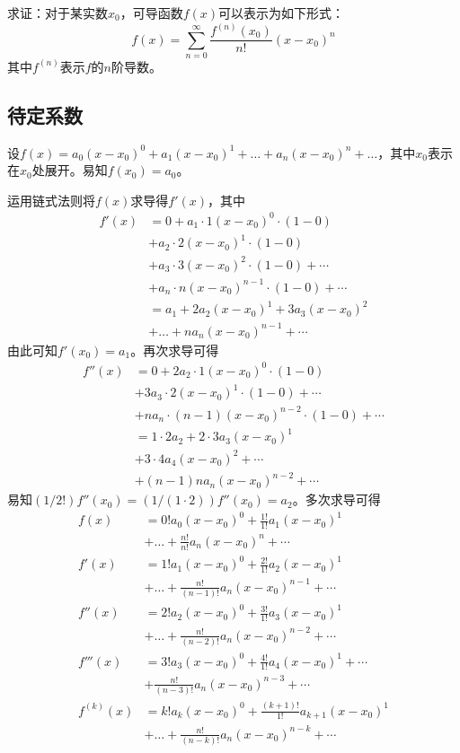 

求证：对于某实数$x_0$，可导函数$f(x)$可以表示为如下形式：
\[ f(x) = \sum_{n = 0}^\infty \frac{f^{(n)}(x_0)}{n!}(x - x_0)^n \]
其中$f^{(n)}$表示$f$的$n$阶导数。

\subsection{待定系数}

设$f(x) = a_0(x - x_0)^0 + a_1(x - x_0)^1 + \dots + a_n(x - x_0)^n + \dots$，其中$x_0$表示在$x_0$处展开。易知$f(x_0) = a_0$。

运用链式法则将$f(x)$求导得$f'(x)$，其中
\begin{align*}
  f'(x) &= 0 + a_1\cdot1(x - x_0)^0\cdot(1 - 0) \\
  &+ a_2\cdot2(x - x_0)^1\cdot(1 - 0) \\
  &+ a_3\cdot3(x - x_0)^2\cdot(1 - 0) + \cdots \\
  &+ a_n\cdot n(x - x_0)^{n - 1}\cdot(1 - 0) + \cdots \\
  &= a_1 + 2a_2(x - x_0)^1 + 3a_3(x - x_0)^2 \\
  &+ \dots + na_n(x - x_0)^{n - 1} + \cdots
\end{align*}
由此可知$f'(x_0) = a_1$。再次求导可得
\begin{align*}
  f''(x) &= 0 + 2a_2\cdot1(x - x_0)^0\cdot(1 - 0) \\
  &+ 3a_3\cdot2(x - x_0)^1\cdot(1 - 0) + \cdots \\
  &+ na_n\cdot(n - 1)(x - x_0)^{n - 2}\cdot(1 - 0) + \cdots \\
  &= 1\cdot2a_2 + 2\cdot3a_3(x - x_0)^1 \\
  &+ 3\cdot4a_4(x - x_0)^2 + \cdots \\
  &+ (n - 1)na_n(x - x_0)^{n - 2} + \cdots
\end{align*}
易知$(1/2!)f''(x_0) = (1/(1\cdot2))f''(x_0) = a_2$。多次求导可得
\begin{align*}
  f(x) &= 0!a_0(x - x_0)^0 + \frac{1!}{1!}a_1(x - x_0)^1 \\
  &+ \dots + \frac{n!}{n!}a_n(x - x_0)^n + \cdots \\
  f'(x) &= 1!a_1(x - x_0)^0 + \frac{2!}{1!}a_2(x - x_0)^1 \\
  &+ \dots + \frac{n!}{(n - 1)!}a_n(x - x_0)^{n - 1} + \cdots \\
  f''(x) &= 2!a_2(x - x_0)^0 + \frac{3!}{1!}a_3(x - x_0)^1 \\
  &+ \dots + \frac{n!}{(n - 2)!}a_n(x - x_0)^{n - 2} + \cdots \\
  f'''(x) &= 3!a_3(x - x_0)^0 + \frac{4!}{1!}a_4(x - x_0)^1 + \cdots \\
  &+ \frac{n!}{(n - 3)!}a_n(x - x_0)^{n - 3} + \cdots \\
  f^{(k)}(x) &= k!a_k(x - x_0)^0 + \frac{(k + 1)!}{1!}a_{k + 1}(x - x_0)^1 \\
  &+ \dots + \frac{n!}{(n - k)!}a_n(x - x_0)^{n - k} + \cdots
\end{align*}
